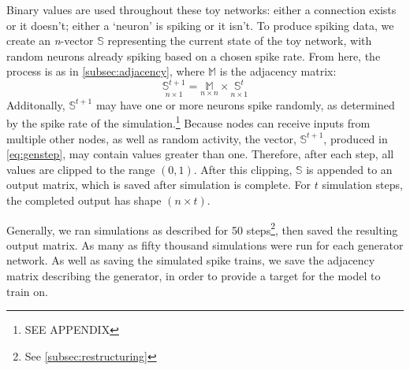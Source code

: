 \begin{table}[h]
	\centering
	
	\hspace{2em}
	\label{fig:toyex}
\end{table}\noindent
Binary values are used throughout these toy networks: either a connection exists 
or it doesn't; either a `neuron' is spiking or it isn't. To produce spiking 
data, we create an \textit{n}-vector $\mathbb{S}$ representing the current state 
of the toy network, with random neurons already spiking based on a chosen spike 
rate. From here, the process is as in \ref{subsec:adjacency}, where $\mathbb{M}$ 
is the adjacency matrix:
\begin{equation}
	\underset{n \times 1}{\mathbb{S}^{t+1}} = \underset{n \times n}{\mathbb{M}} 
	\times \underset{n \times 1}{\mathbb{S}^t}
	\label{eq:genstep}
\end{equation}
Additonally, $\mathbb{S}^{t+1}$ may have one or more neurons spike randomly, as 
determined by the spike rate of the simulation.\footnote{SEE APPENDIX} Because 
nodes can receive inputs from multiple other nodes, as well as random activity, 
the vector, $\mathbb{S}^{t+1}$, produced in \eqref{eq:genstep}, may contain 
values greater than one. Therefore, after each step, all values are clipped to 
the range $(0,1)$. After this clipping, $\mathbb{S}$ is appended to an output 
matrix, which is saved after simulation is complete.  For $t$ simulation steps, 
the completed output has shape $(n \times t)$.

Generally, we ran simulations as described for 50 steps\footnote{See 
\ref{subsec:restructuring}}, then saved the resulting output matrix. As many as 
fifty thousand simulations were run for each generator network.
As well as saving the simulated spike trains, we save the adjacency matrix 
describing the generator, in order to provide a target for the model to train 
on.

